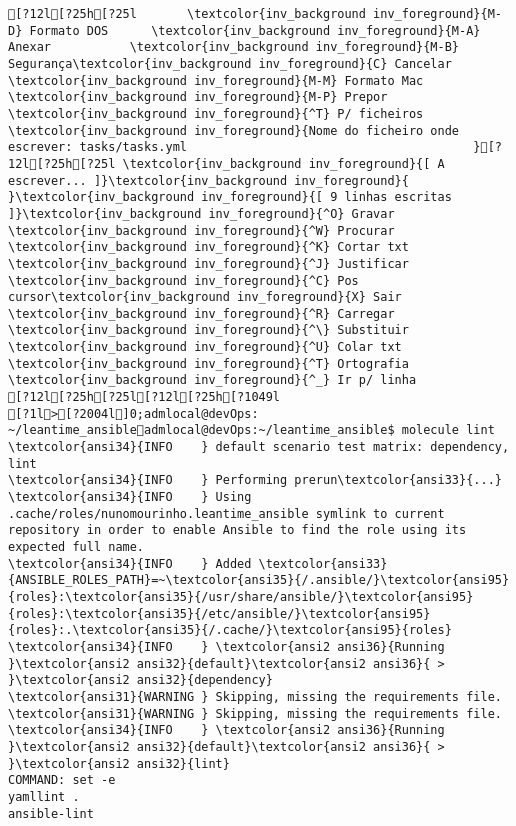 \documentclass{scrartcl}
\begin{document}
\begin{Verbatim}
[?12l[?25h[?25l       \textcolor{inv_background inv_foreground}{M-D} Formato DOS      \textcolor{inv_background inv_foreground}{M-A} Anexar           \textcolor{inv_background inv_foreground}{M-B} Segurança\textcolor{inv_background inv_foreground}{C} Cancelar          \textcolor{inv_background inv_foreground}{M-M} Formato Mac      \textcolor{inv_background inv_foreground}{M-P} Prepor           \textcolor{inv_background inv_foreground}{^T} P/ ficheiros
\textcolor{inv_background inv_foreground}{Nome do ficheiro onde escrever: tasks/tasks.yml                                        }[?12l[?25h[?25l \textcolor{inv_background inv_foreground}{[ A escrever... ]}\textcolor{inv_background inv_foreground}{          }\textcolor{inv_background inv_foreground}{[ 9 linhas escritas ]}\textcolor{inv_background inv_foreground}{^O} Gravar     \textcolor{inv_background inv_foreground}{^W} Procurar   \textcolor{inv_background inv_foreground}{^K} Cortar txt \textcolor{inv_background inv_foreground}{^J} Justificar \textcolor{inv_background inv_foreground}{^C} Pos cursor\textcolor{inv_background inv_foreground}{X} Sair       \textcolor{inv_background inv_foreground}{^R} Carregar   \textcolor{inv_background inv_foreground}{^\} Substituir \textcolor{inv_background inv_foreground}{^U} Colar txt  \textcolor{inv_background inv_foreground}{^T} Ortografia \textcolor{inv_background inv_foreground}{^_} Ir p/ linha
[?12l[?25h[?25l[?12l[?25h[?1049l
[?1l>[?2004l]0;admlocal@devOps: ~/leantime_ansibleadmlocal@devOps:~/leantime_ansible$ molecule lint
\textcolor{ansi34}{INFO    } default scenario test matrix: dependency, lint
\textcolor{ansi34}{INFO    } Performing prerun\textcolor{ansi33}{...}
\textcolor{ansi34}{INFO    } Using .cache/roles/nunomourinho.leantime_ansible symlink to current repository in order to enable Ansible to find the role using its expected full name.
\textcolor{ansi34}{INFO    } Added \textcolor{ansi33}{ANSIBLE_ROLES_PATH}=~\textcolor{ansi35}{/.ansible/}\textcolor{ansi95}{roles}:\textcolor{ansi35}{/usr/share/ansible/}\textcolor{ansi95}{roles}:\textcolor{ansi35}{/etc/ansible/}\textcolor{ansi95}{roles}:.\textcolor{ansi35}{/.cache/}\textcolor{ansi95}{roles}
\textcolor{ansi34}{INFO    } \textcolor{ansi2 ansi36}{Running }\textcolor{ansi2 ansi32}{default}\textcolor{ansi2 ansi36}{ > }\textcolor{ansi2 ansi32}{dependency}
\textcolor{ansi31}{WARNING } Skipping, missing the requirements file.
\textcolor{ansi31}{WARNING } Skipping, missing the requirements file.
\textcolor{ansi34}{INFO    } \textcolor{ansi2 ansi36}{Running }\textcolor{ansi2 ansi32}{default}\textcolor{ansi2 ansi36}{ > }\textcolor{ansi2 ansi32}{lint}
COMMAND: set -e
yamllint .
ansible-lint


\end{Verbatim}
\end{document}

